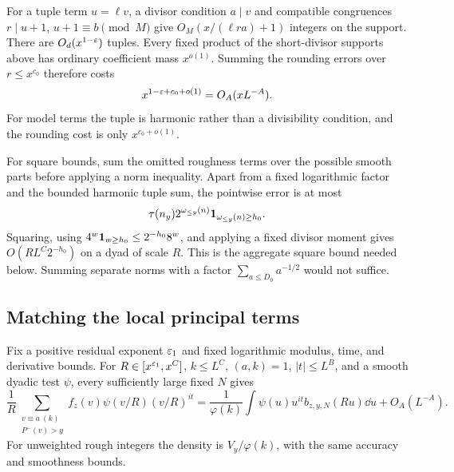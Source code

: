 For a tuple term $u=\ell v$, a divisor condition $a\mid v$ and
compatible congruences $r\mid u+1$, $u+1\equiv b\pmod M$ give
$O_M(x/(\ell ra)+1)$ integers on the support. There are
$O_d(x^{1-\varepsilon})$ tuples. Every fixed product of the short-divisor
supports above has ordinary coefficient mass $x^{o(1)}$. Summing
the rounding errors over $r\leq x^{c_0}$ therefore costs
\begin{equation}\label{eq:rounding}
 x^{1-\varepsilon+c_0+o(1)}=O_A(xL^{-A}).
\end{equation}
For model terms the tuple is harmonic rather than a divisibility
condition, and the rounding cost is only $x^{c_0+o(1)}$.

For square bounds, sum the omitted roughness terms over the possible
smooth parts before applying a norm inequality. Apart from a fixed
logarithmic factor and the bounded harmonic tuple sum, the pointwise
error is at most
\[
 \tau(n_y)2^{\omega_{\leq y}(n)}
       \mathbf 1_{\omega_{\leq y}(n)\geq h_0}.
\]
Squaring, using $4^w\mathbf 1_{w\geq h_0}\leq2^{-h_0}8^w$, and applying
a fixed divisor moment gives $O(RL^C2^{-h_0})$ on a dyad of scale $R$.
This is the aggregate square bound needed below. Summing separate
norms with a factor $\sum_{a\leq D_0}a^{-1/2}$ would not suffice.

\subsection{Matching the local principal terms}

\begin{lemma}\label{lem:roughdensity}
Fix a positive residual exponent $\varepsilon_1$ and fixed logarithmic
modulus, time, and derivative bounds. For $R\in[x^{\varepsilon_1},x^C]$,
$k\leq L^C$, $(a,k)=1$, $|t|\leq L^B$, and a smooth dyadic test
$\psi$, every sufficiently large fixed $N$ gives
\begin{equation}\label{eq:roughdensity}
 \frac1R\sum_{\substack{v\equiv a\ (k)\\P^-(v)>y}}
 f_z(v)\psi(v/R)(v/R)^{it}
 =\frac1{\varphi(k)}\int\psi(u)u^{it}b_{z,y,N}(Ru)\dd u
       +O_A(L^{-A}).
\end{equation}
For unweighted rough integers the density is $V_y/\varphi(k)$,
with the same accuracy and smoothness bounds.
\end{lemma}

